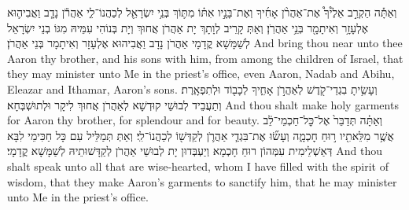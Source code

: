 \newperek
{}%
{וְאַתָּ֡ה הַקְרֵ֣ב אֵלֶ֩יךָ֩ אֶת־אַהֲרֹ֨ן אָחִ֜יךָ וְאֶת־בָּנָ֣יו אִתּ֗וֹ מִתּ֛וֹךְ בְּנֵ֥י יִשְׂרָאֵ֖ל לְכַהֲנוֹ־לִ֑י אַהֲרֹ֕ן נָדָ֧ב וַאֲבִיה֛וּא אֶלְעָזָ֥ר וְאִיתָמָ֖ר בְּנֵ֥י אַהֲרֹֽן׃
}
{וְאַתְּ קָרֵיב לְוָתָךְ יָת אַהֲרֹן אֲחוּךְ וְיָת בְּנוֹהִי עִמֵּיהּ מִגּוֹ בְנֵי יִשְׂרָאֵל לְשַׁמָּשָׁא קֳדָמָי אַהֲרֹן נָדָב וַאֲבִיהוּא אֶלְעָזָר וְאִיתָמָר בְּנֵי אַהֲרֹן׃}
{And bring thou near unto thee Aaron thy brother, and his sons with him, from among the children of Israel, that they may minister unto Me in the priest’s office, even Aaron, Nadab and Abihu, Eleazar and Ithamar, Aaron’s sons.}{}
{וְעָשִׂ֥יתָ בִגְדֵי־קֹ֖דֶשׁ לְאַהֲרֹ֣ן אָחִ֑יךָ לְכָב֖וֹד וּלְתִפְאָֽרֶת׃}
{וְתַעֲבֵיד לְבוּשֵׁי קוּדְשָׁא לְאַהֲרֹן אֲחוּךְ לִיקָר וּלְתוּשְׁבְּחָא׃}
{And thou shalt make holy garments for Aaron thy brother, for splendour and for beauty.}{}
{וְאַתָּ֗ה תְּדַבֵּר֙ אֶל־כׇּל־חַכְמֵי־לֵ֔ב אֲשֶׁ֥ר מִלֵּאתִ֖יו ר֣וּחַ חׇכְמָ֑ה וְעָשׂ֞וּ אֶת־בִּגְדֵ֧י אַהֲרֹ֛ן לְקַדְּשׁ֖וֹ לְכַהֲנוֹ־לִֽי׃
}
{וְאַתְּ תְּמַלֵּיל עִם כָּל חַכִּימֵי לִבָּא דְּאַשְׁלֵימִית עִמְּהוֹן רוּחַ חָכְמָא וְיַעְבְּדוּן יָת לְבוּשֵׁי אַהֲרֹן לְקַדָּשׁוּתֵיהּ לְשַׁמָּשָׁא קֳדָמָי׃}
{And thou shalt speak unto all that are wise-hearted, whom I have filled with the spirit of wisdom, that they make Aaron’s garments to sanctify him, that he may minister unto Me in the priest’s office.}{}

